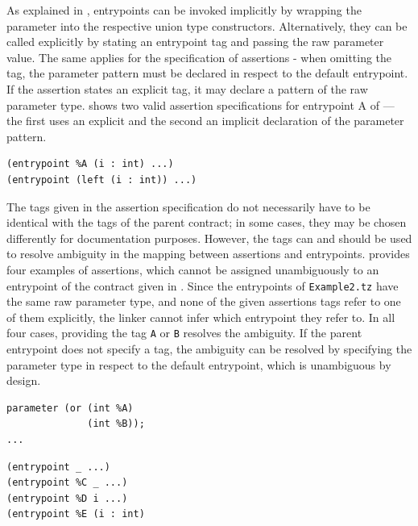 As explained in , entrypoints can be invoked implicitly by wrapping the parameter into the respective union type constructors. Alternatively, they can be called explicitly by stating an entrypoint tag and passing the raw parameter value. The same applies for the specification of assertions - when omitting the tag, the parameter pattern must be declared in respect to the default entrypoint. If the assertion states an explicit tag, it may declare a pattern of the raw parameter type.  shows two valid assertion specifications for entrypoint A of  --- the first uses an explicit and the second an implicit declaration of the parameter pattern. 
\begin{lstlisting}[language=Assertion, numbers=none, caption=Explicit and implicit assertion specification, label=lst:impl_expl]
(entrypoint %A (i : int) ...)
(entrypoint (left (i : int)) ...)
\end{lstlisting}

The tags given in the assertion specification do not necessarily have to be identical with the tags of the parent contract; in some cases, they may be chosen differently for documentation purposes. However, the tags can and should be used to resolve ambiguity in the mapping between assertions and entrypoints.  provides four examples of assertions, which cannot be assigned unambiguously to an entrypoint of the contract given in . Since the entrypoints of \texttt{Example2.tz} have the same raw parameter type, and none of the given assertions tags refer to one of them explicitly, the linker cannot infer which entrypoint they refer to. In all four cases, providing the tag \texttt{A} or \texttt{B} resolves the ambiguity. If the parent entrypoint does not specify a tag, the ambiguity can be resolved by specifying the parameter type in respect to the default entrypoint, which is unambiguous by design. 

\vspace{\baselineskip}
\noindent
\begin{minipage}{.4\textwidth}
\begin{lstlisting}[label=lst:ambiguity_parent, numbers=none, language=Michelson, caption=Example2.tz]
parameter (or (int %A)
              (int %B));
...
\end{lstlisting}
\end{minipage}\hfill
\begin{minipage}{.5\textwidth}
\begin{lstlisting}[label=lst:ambiguity_assertion, language=Assertion, caption=Ambiguous assertions for Example2.tz]
(entrypoint _ ...)
(entrypoint %C _ ...)
(entrypoint %D i ...)
(entrypoint %E (i : int)
\end{lstlisting}
\end{minipage}
\vspace{\baselineskip}


